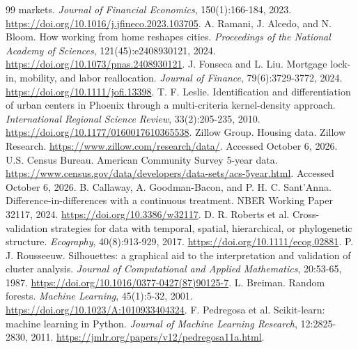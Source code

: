 \documentclass[11pt]{article}
\begin{document}
\begin{thebibliography}{99}
markets. \textit{Journal of Financial Economics}, 150(1):166-184, 2023.
\url{https://doi.org/10.1016/j.jfineco.2023.103705}.
 A. Ramani, J. Alcedo, and N. Bloom. How working from home reshapes cities. \textit{Proceedings of the
National Academy of Sciences}, 121(45):e2408930121, 2024. \url{https://doi.org/10.1073/pnas.2408930121}.
 J. Fonseca and L. Liu. Mortgage lock-in, mobility, and labor reallocation. \textit{Journal of
Finance}, 79(6):3729-3772, 2024. \url{https://doi.org/10.1111/jofi.13398}.
 T. F. Leslie. Identification and differentiation of urban centers in Phoenix through a
multi-criteria kernel-density approach. \textit{International Regional Science Review}, 33(2):205-235, 2010.
\url{https://doi.org/10.1177/0160017610365538}.
 Zillow Group. Housing data. Zillow Research.
\url{https://www.zillow.com/research/data/}. Accessed October 6, 2026.
 U.S. Census Bureau. American Community Survey 5-year data.
\url{https://www.census.gov/data/developers/data-sets/acs-5year.html}. Accessed October 6, 2026.
 B. Callaway, A. Goodman-Bacon, and P. H. C. Sant'Anna. Difference-in-differences with a continuous
treatment. NBER Working Paper 32117, 2024. \url{https://doi.org/10.3386/w32117}.
 D. R. Roberts et al. Cross-validation strategies for data with temporal, spatial, hierarchical, or phylogenetic
structure. \textit{Ecography}, 40(8):913-929, 2017. \url{https://doi.org/10.1111/ecog.02881}.
 P. J. Rousseeuw. Silhouettes: a graphical aid to the interpretation and validation of cluster analysis.
\textit{Journal of Computational and Applied Mathematics}, 20:53-65, 1987.
\url{https://doi.org/10.1016/0377-0427(87)90125-7}.
 L. Breiman. Random forests. \textit{Machine Learning}, 45(1):5-32, 2001.
\url{https://doi.org/10.1023/A:1010933404324}.
 F. Pedregosa et al. Scikit-learn: machine learning in Python. \textit{Journal of Machine Learning Research},
12:2825-2830, 2011. \url{https://jmlr.org/papers/v12/pedregosa11a.html}.
\end{thebibliography}
\end{document}
